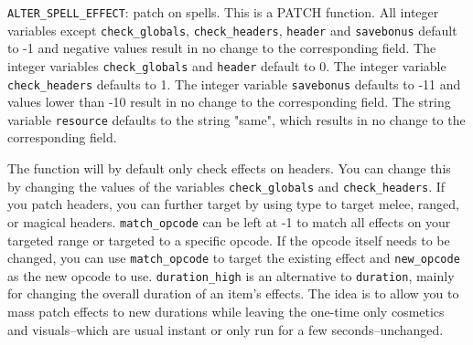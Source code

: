 \documentclass{article}
\begin{document}
\verb+ALTER_SPELL_EFFECT+: patch  on spells. This is a PATCH function. All integer variables except \verb+check_globals+, \verb+check_headers+, \verb+header+ and \verb+savebonus+ default to -1 and negative values result in no change to the corresponding field. The integer variables \verb+check_globals+ and \verb+header+ default to 0. The integer variable \verb+check_headers+ defaults to 1. The integer variable \verb+savebonus+ defaults to -11 and values lower than -10 result in no change to the corresponding field. The string variable \verb+resource+ defaults to the string "same", which results in no change to the corresponding field.

The function will by default only check effects on headers. You can change this by changing the values of the variables \verb+check_globals+ and \verb+check_headers+. If you patch headers, you can further target by using type to target melee, ranged, or magical headers. \verb+match_opcode+ can be left at -1 to match all effects on your targeted range or targeted to a specific opcode. If the opcode itself needs to be changed, you can use \verb+match_opcode+ to target the existing effect and \verb+new_opcode+ as the new opcode to use. \verb+duration_high+ is an alternative to \verb+duration+, mainly for changing the overall duration of an item's effects. The idea is to allow you to mass patch effects to new durations while leaving the one-time only cosmetics and visuals--which are usual instant or only run for a few seconds--unchanged.
\end{document}
